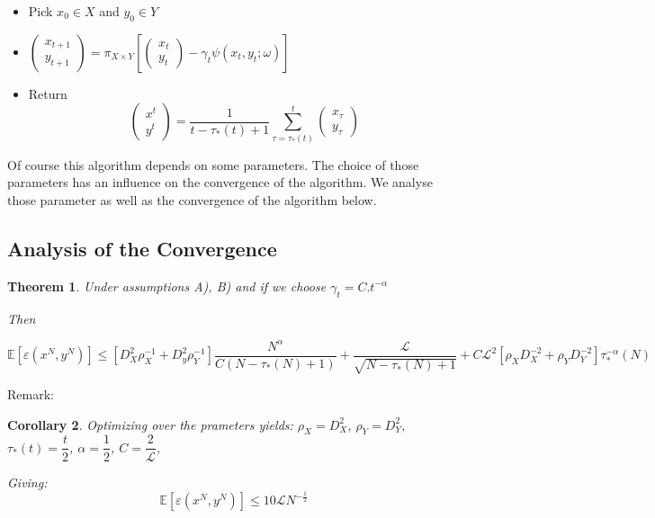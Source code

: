 \documentclass[12pt,reqno]{amsart}
\newtheorem{thm}{Theorem}[section]
\newtheorem{cor}[thm]{Corollary}
\numberwithin{equation}{section}
\begin{document}
\begin{itemize}
\item Pick $x_{0} \in X$ and $y_{0} \in Y$
\item $\begin{pmatrix} x_{t+1} \\ y_{t+1} \end{pmatrix} = \pi_{X \times Y}[\begin{pmatrix} x_{t} \\ y_{t} \end{pmatrix} - \gamma_{t}\psi(x_{t},y_{t};\omega)]$
\item Return 
$$
\begin{pmatrix} x^{t} \\ y^{t} \end{pmatrix} = \dfrac{1}{t - \tau_{*}(t) + 1}\sum_{\tau = \tau_{*}(t)}^{t}\begin{pmatrix} x_{\tau} \\ y_{\tau} \end{pmatrix}
$$
\end{itemize}


Of course this algorithm depends on some parameters. The choice of those parameters has an influence on the convergence of the algorithm. We analyse those parameter as well as the convergence of the algorithm below.

\subsection{Analysis of the Convergence}

\begin{thm}

Under assumptions A), B) and if we choose $\gamma_{t} = C.t^{-\alpha}$

Then

$$
\mathbb{E}[\varepsilon(x^{N},y^{N})] \leq [D_{X}^{2}\rho_{X}^{-1} + D_{y}^{2}\rho_{Y}^{-1}]\dfrac{N^{\alpha}}{C(N - \tau_{*}(N) + 1)} +  \dfrac{\mathcal{L}}{\sqrt{N - \tau_{*}(N) + 1}}+ C\mathcal{L}^{2}[\rho_{X}D_{X}^{-2} + \rho_{Y}D_{Y}^{-2}]\tau_{*}^{-\alpha}(N)
$$

\end{thm}


Remark: 

\begin{cor}
Optimizing over the prameters yields:
 $\rho_{X} = D_{X}^{2}$,
$\rho_{Y} = D_{Y}^{2}$,
$\tau_{*}(t) = \dfrac{t}{2}$,
$\alpha = \dfrac{1}{2}$,
$C = \dfrac{2}{\mathcal{L}}$,

Giving:
$$
\boxed{ \mathbb{E}[\varepsilon(x^{N},y^{N})]  \leq 10\mathcal{L} N^{-\frac{1}{2}} }
$$
\end{cor}
\end{document}
